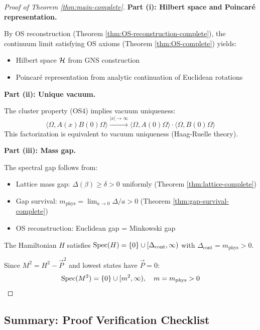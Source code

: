 \begin{proof}[Proof of Theorem \ref{thm:main-complete}]

\textbf{Part (i): Hilbert space and Poincar\'e representation.}

By OS reconstruction (Theorem \ref{thm:OS-reconstruction-complete}), the continuum 
limit satisfying OS axioms (Theorem \ref{thm:OS-complete}) yields:
\begin{itemize}
\item Hilbert space $\mathcal{H}$ from GNS construction
\item Poincar\'e representation from analytic continuation of Euclidean rotations
\end{itemize}

\textbf{Part (ii): Unique vacuum.}

The cluster property (OS4) implies vacuum uniqueness:
\[
\langle \Omega, A(x) B(0) \Omega \rangle \xrightarrow{|x| \to \infty} 
\langle \Omega, A(0) \Omega \rangle \cdot \langle \Omega, B(0) \Omega \rangle
\]
This factorization is equivalent to vacuum uniqueness (Haag-Ruelle theory).

\textbf{Part (iii): Mass gap.}

The spectral gap follows from:
\begin{itemize}
\item Lattice mass gap: $\Delta(\beta) \geq \delta > 0$ uniformly (Theorem \ref{thm:lattice-complete})
\item Gap survival: $m_{\text{phys}} = \lim_{a \to 0} \Delta/a > 0$ (Theorem \ref{thm:gap-survival-complete})
\item OS reconstruction: Euclidean gap = Minkowski gap
\end{itemize}

The Hamiltonian $H$ satisfies $\operatorname{Spec}(H) = \{0\} \cup [\Delta_{\text{cont}}, \infty)$
with $\Delta_{\text{cont}} = m_{\text{phys}} > 0$.

Since $M^2 = H^2 - \vec{P}^2$ and lowest states have $\vec{P} = 0$:
\[
\operatorname{Spec}(M^2) = \{0\} \cup [m^2, \infty), \quad m = m_{\text{phys}} > 0 \qedhere
\]
\end{proof}

\subsection{Summary: Proof Verification Checklist}

